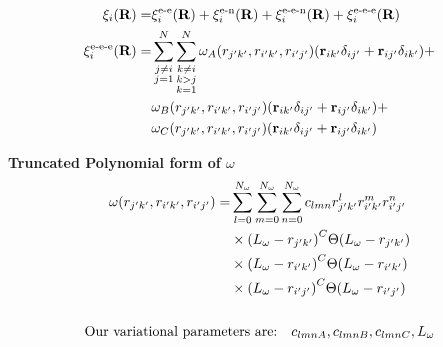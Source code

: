 \documentclass[10pt]{beamer}
\begin{document}
\begin{frame}[allowframebreaks]
    \begin{align}
        \vb{\xi}_i\pqty{\vb{R}}=&
        \vb{\xi}_i^{\text{e-e}}\pqty{\vb{R}}+
        \vb{\xi}_i^{\text{e-n}}\pqty{\vb{R}}+
        \vb{\xi}_i^{\text{e-e-n}}\pqty{\vb{R}}+
        \vb{\xi}_i^{\text{e-e-e}}\pqty{\vb{R}}
        \\
        \vb{\xi}_i^{\text{e-e-e}}\pqty{\vb{R}}=&
        \sum\limits_{\substack{j\neq i\\j=1}}^{N}
        \sum\limits_{\substack{k\neq i\\k>j\\k=1}}^{N}
        \omega_A\pqty{r_{j'k'},r_{i'k'},r_{i'j'}}
        \pqty{\vb{r}_{ik'}\delta_{ij'}+\vb{r}_{ij'}\delta_{ik'}}+\nonumber\\
        &\omega_B\pqty{r_{j'k'},r_{i'k'},r_{i'j'}}
        \pqty{\vb{r}_{ik'}\delta_{ij'}+\vb{r}_{ij'}\delta_{ik'}}+\nonumber\\
        &\omega_C\pqty{r_{j'k'},r_{i'k'},r_{i'j'}}
        \pqty{\vb{r}_{ik'}\delta_{ij'}+\vb{r}_{ij'}\delta_{ik'}}
    \end{align}
    \framebreak

    \textbf{Truncated Polynomial form of $\omega$}
    \begin{gather}
        \begin{align}
            \omega\pqty{r_{j'k'},r_{i'k'},r_{i'j'}}=&
            \sum\limits_{l=0}^{N_\omega}
            \sum\limits_{m=0}^{N_\omega}
            \sum\limits_{n=0}^{N_\omega}
            c_{lmn}r_{j'k'}^lr_{i'k'}^mr_{i'j'}^n\nonumber\\
            &\times\pqty{L_\omega-r_{j'k'}}^C
            \Theta\pqty{L_\omega-r_{j'k'}}\nonumber\\
            &\times\pqty{L_\omega-r_{i'k'}}^C
            \Theta\pqty{L_\omega-r_{i'k'}}\nonumber\\
            &\times\pqty{L_\omega-r_{i'j'}}^C
            \Theta\pqty{L_\omega-r_{i'j'}}
        \end{align}\\
        \\
        \nonumber
        \text{Our variational parameters are:}\quad
        c_{lmnA},c_{lmnB},c_{lmnC},L_\omega
    \end{gather}
\end{frame}
\end{document}
